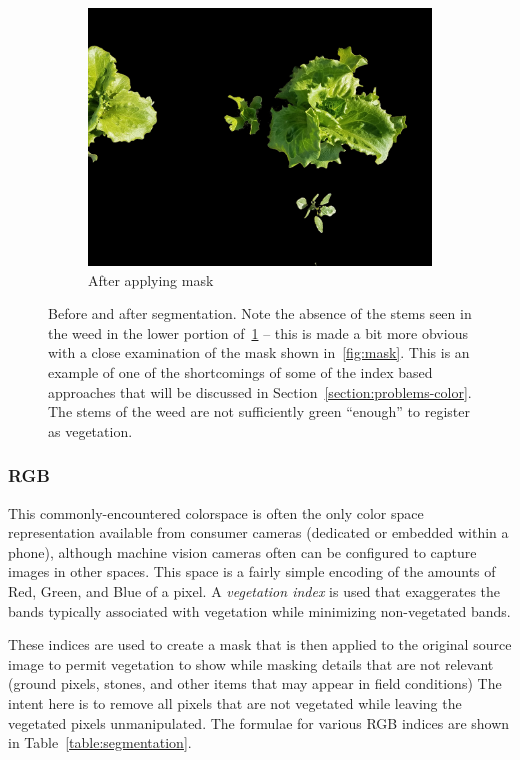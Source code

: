 \documentclass[letterpaper]{article}
\begin{document}
\begin{figure}[H]
\begin{subfigure}[h]{.30\textwidth}
	  \includegraphics[width=1\linewidth]{figures/original-masked.jpg}
	  \caption{After applying mask}
	  \label{fig:original-masked}
	\end{subfigure}
	\caption[Before and after segmentation]{Before and after segmentation. Note the absence of the stems seen in the weed in the lower portion of~\ref{fig:original-masked} -- this is made a bit more obvious with a close examination of the mask shown in~\ref{fig:mask}.  This is an example of one of the shortcomings of some of the index based approaches that will be discussed in Section~\ref{section:problems-color}. The stems of the weed are not sufficiently green ``enough'' to register as vegetation.}
	\label{fig:segmentation}
\end{figure}

\subsubsection{RGB}
This commonly-encountered colorspace is often the only color space representation available from consumer cameras (dedicated or embedded within a phone), although machine vision cameras often can be configured to capture images in other spaces. This space is a fairly simple encoding of the amounts of Red, Green, and Blue of a pixel. A \textit{vegetation index} is used that exaggerates the bands typically associated with vegetation while minimizing non-vegetated bands.

These indices are used to create a mask that is then applied to the original source image to permit vegetation to show while masking details that are not relevant (ground pixels, stones, and other items that may appear in field conditions) The intent here is to remove all pixels that are not vegetated while leaving the vegetated pixels unmanipulated. The formulae for various RGB indices are shown in Table~\ref{table:segmentation}.
\end{document}
